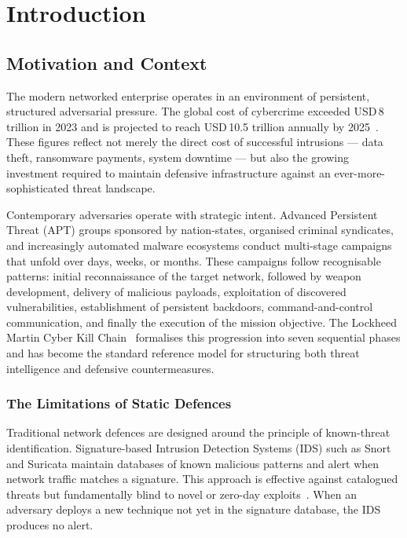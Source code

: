 \chapter{Introduction}
\label{ch:introduction}

\section{Motivation and Context}

The modern networked enterprise operates in an environment of persistent,
structured adversarial pressure.
The global cost of cybercrime exceeded USD\,8 trillion in 2023 and is
projected to reach USD\,10.5 trillion annually by 2025~\citep{cisa2023threat}.
These figures reflect not merely the direct cost of successful intrusions ---
data theft, ransomware payments, system downtime --- but also the growing
investment required to maintain defensive infrastructure against an ever-more-
sophisticated threat landscape.

Contemporary adversaries operate with strategic intent.
Advanced Persistent Threat (APT) groups sponsored by nation-states, organised
criminal syndicates, and increasingly automated malware ecosystems conduct
multi-stage campaigns that unfold over days, weeks, or months.
These campaigns follow recognisable patterns: initial reconnaissance of the
target network, followed by weapon development, delivery of malicious payloads,
exploitation of discovered vulnerabilities, establishment of persistent
backdoors, command-and-control communication, and finally the execution of
the mission objective.
The Lockheed Martin Cyber Kill Chain~\citep{hutchins2011intelligence} formalises
this progression into seven sequential phases and has become the standard
reference model for structuring both threat intelligence and defensive
countermeasures.

\subsection{The Limitations of Static Defences}

Traditional network defences are designed around the principle of known-threat
identification.
Signature-based Intrusion Detection Systems (IDS) such as Snort and Suricata
maintain databases of known malicious patterns and alert when network traffic
matches a signature.
This approach is effective against catalogued threats but fundamentally blind to
novel or zero-day exploits~\citep{tavallaee2009detailed}.
When an adversary deploys a new technique not yet in the signature database,
the IDS produces no alert.

